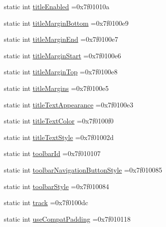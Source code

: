 \begin{DoxyCompactItemize}
\item 
static int \hyperlink{classandroid_1_1support_1_1v7_1_1recyclerview_1_1R_1_1attr_a86ef1840ac5538d23ae4ab4fa8b2ec6b}{title\+Enabled} =0x7f01010a
\item 
static int \hyperlink{classandroid_1_1support_1_1v7_1_1recyclerview_1_1R_1_1attr_a7ae1d2779edb2b16c5d356d2d5cf04d4}{title\+Margin\+Bottom} =0x7f0100e9
\item 
static int \hyperlink{classandroid_1_1support_1_1v7_1_1recyclerview_1_1R_1_1attr_ac24225efdc0b6f7ba7fb2e4c1f9a3a37}{title\+Margin\+End} =0x7f0100e7
\item 
static int \hyperlink{classandroid_1_1support_1_1v7_1_1recyclerview_1_1R_1_1attr_a42dd963428d4cb0a9158e9d1aa5e7706}{title\+Margin\+Start} =0x7f0100e6
\item 
static int \hyperlink{classandroid_1_1support_1_1v7_1_1recyclerview_1_1R_1_1attr_aa37a853cbf758c45773a8a3dfd60b0fc}{title\+Margin\+Top} =0x7f0100e8
\item 
static int \hyperlink{classandroid_1_1support_1_1v7_1_1recyclerview_1_1R_1_1attr_ab33f7de0dc6207e5c2ad167b14a97be0}{title\+Margins} =0x7f0100e5
\item 
static int \hyperlink{classandroid_1_1support_1_1v7_1_1recyclerview_1_1R_1_1attr_a13293aa0f7b4ed66fa67e3a093190bc9}{title\+Text\+Appearance} =0x7f0100e3
\item 
static int \hyperlink{classandroid_1_1support_1_1v7_1_1recyclerview_1_1R_1_1attr_ac6636a11b2af03de8fd840d96dea70df}{title\+Text\+Color} =0x7f0100f0
\item 
static int \hyperlink{classandroid_1_1support_1_1v7_1_1recyclerview_1_1R_1_1attr_a899c3bcee2eda4e5c82fb61c86a38f29}{title\+Text\+Style} =0x7f01002d
\item 
static int \hyperlink{classandroid_1_1support_1_1v7_1_1recyclerview_1_1R_1_1attr_a5bdbbf426a96cc88a8bcb370a553a7a3}{toolbar\+Id} =0x7f010107
\item 
static int \hyperlink{classandroid_1_1support_1_1v7_1_1recyclerview_1_1R_1_1attr_a47fb36cb5b950c9e5f374ea86d000d70}{toolbar\+Navigation\+Button\+Style} =0x7f010085
\item 
static int \hyperlink{classandroid_1_1support_1_1v7_1_1recyclerview_1_1R_1_1attr_aefd9069784f7d350aa927b9fcb98e4e8}{toolbar\+Style} =0x7f010084
\item 
static int \hyperlink{classandroid_1_1support_1_1v7_1_1recyclerview_1_1R_1_1attr_a71089b6d21116d5d7a23954f4f212044}{track} =0x7f0100dc
\item 
static int \hyperlink{classandroid_1_1support_1_1v7_1_1recyclerview_1_1R_1_1attr_aaeae321fc3b1a48c466ee85c5dcd1353}{use\+Compat\+Padding} =0x7f010118

\end{DoxyCompactItemize}

